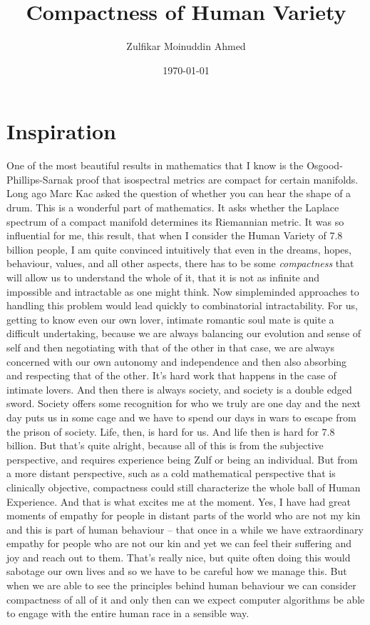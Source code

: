 \documentclass{amsart}
\title{Compactness of Human Variety}
\author{Zulfikar Moinuddin Ahmed}
\date{\today}
\begin{document}
\maketitle

\section{Inspiration}

One of the most beautiful results in mathematics that I know is the Osgood-Phillips-Sarnak proof that isospectral metrics are compact for certain manifolds.  Long ago Marc Kac asked the question of whether you can hear the shape of a drum.  This is a wonderful part of mathematics.  It asks whether the Laplace spectrum of a compact manifold determines its Riemannian metric.  It was so influential for me, this result, that when I consider the Human Variety of 7.8 billion people, I am quite convinced intuitively that even in the dreams, hopes, behaviour, values, and all other aspects, there has to be some {\em compactness} that will allow us to understand the whole of it, that it is not as infinite and impossible and intractable as one might think.  Now simpleminded approaches to handling this problem would lead quickly to combinatorial intractability.  For us, getting to know even our own lover, intimate romantic soul mate is quite a difficult undertaking, because we are always balancing our evolution and sense of self and then negotiating with that of the other in that case, we are always concerned with our own autonomy and independence and then also absorbing and respecting that of the other.  It's hard work that happens in the case of intimate lovers.  And then there is always society, and society is a double edged sword.  Society offers some recognition for who we truly are one day and the next day puts us in some cage and we have to spend our days in wars to escape from the prison of society.  Life, then, is hard for us.  And life then is hard for 7.8 billion.  But that's quite alright, because all of this is from the subjective perspective, and requires experience being Zulf or being an individual.  But from a more distant perspective, such as a cold mathematical perspective that is clinically objective, compactness could still characterize the whole ball of Human Experience.  And that is what excites me at the moment.  Yes, I have had great moments of empathy for people in distant parts of the world who are not my kin and this is part of human behaviour -- that once in a while we have extraordinary empathy for people who are not our kin and yet we can feel their suffering and joy and reach out to them.  That's really nice, but quite often doing this would sabotage our own lives and so we have to be careful how we manage this.  But when we are able to see the principles behind human behaviour we can consider compactness of all of it and only then can we expect computer algorithms be able to engage with the entire human race in a sensible way.  
\end{document}
